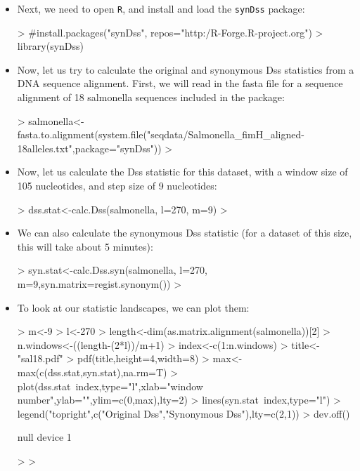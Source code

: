 \documentclass[notitlepage]{article}
\begin{document}
\begin{itemize}
\item Next, we need to open {\tt{R}}, and install and load the {\tt{synDss}} package:
\begin{Schunk}
\begin{Sinput}
> #install.packages("synDss", repos="http:/R-Forge.R-project.org")
> library(synDss)
\end{Sinput}
\end{Schunk}

\item Now, let us try to calculate the original and synonymous Dss statistics from a DNA sequence
alignment. First, we will read in the fasta file for a sequence alignment of 18 salmonella sequences included
in the package:

\begin{Schunk}
\begin{Sinput}
> salmonella<-fasta.to.alignment(system.file("seqdata/Salmonella_fimH_aligned-18alleles.txt",package="synDss"))
> 
\end{Sinput}
\end{Schunk}

\item Now, let us calculate the Dss statistic for this dataset, with a window size of 105 nucleotides,
and step size of 9 nucleotides:

\begin{Schunk}
\begin{Sinput}
> dss.stat<-calc.Dss(salmonella, l=270, m=9)
> 
\end{Sinput}
\end{Schunk}

\item We can also calculate the synonymous Dss statistic (for a dataset of this size, this will take about 5 minutes):

\begin{Schunk}
\begin{Sinput}
> syn.stat<-calc.Dss.syn(salmonella, l=270, m=9,syn.matrix=regist.synonym())
> 
\end{Sinput}
\end{Schunk}

\item To look at our statistic landscapes, we can plot them:
\begin{Schunk}
\begin{Sinput}
> m<-9
> l<-270
> length<-dim(as.matrix.alignment(salmonella))[2]
> n.windows<-((length-(2*l))/m+1)
> index<-c(1:n.windows)
> title<-"sal18.pdf"
> pdf(title,height=4,width=8)
> max<-max(c(dss.stat,syn.stat),na.rm=T)
> plot(dss.stat~index,type="l",xlab="window number",ylab="",ylim=c(0,max),lty=2)
> lines(syn.stat~index,type="l")
> legend("topright",c("Original Dss","Synonymous Dss"),lty=c(2,1))
> dev.off()
\end{Sinput}
\begin{Soutput}
null device 
          1 
\end{Soutput}
\begin{Sinput}
> 
> 
\end{Sinput}
\end{Schunk}



\end{itemize}
\end{document}
